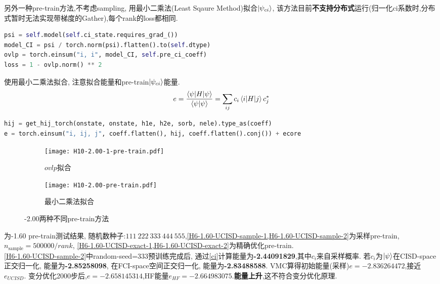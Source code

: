 另外一种pre-train方法,不考虑sampling, 用最小二乘法(Least Sqaure Method)拟合$\ket{\psi_{ci}}$,
该方法目前\textbf{不支持分布式}运行(归一化ci系数时,分布式暂时无法实现带梯度的Gather),每个rank的loss都相同.
\begin{lstlisting}[language=Python]
psi = self.model(self.ci_state.requires_grad_())
model_CI = psi / torch.norm(psi).flatten().to(self.dtype)
ovlp = torch.einsum("i, i", model_CI, self.pre_ci_coeff)
loss = 1 - ovlp.norm() ** 2
\end{lstlisting}
使用最小二乘法拟合,
注意拟合能量和pre-train$\ket{\psi_{ci}}$能量.
\begin{equation}
    e = \frac{\braket{\psi|H|\psi}}{\braket{\psi|\psi}} = \sum_{ij}c_i\braket{i|H|j}c_j^*
    \label{ci}
\end{equation}

\begin{lstlisting}[language=Python]
hij = get_hij_torch(onstate, onstate, h1e, h2e, sorb, nele).type_as(coeff)
e = torch.einsum("i, ij, j", coeff.flatten(), hij, coeff.flatten().conj()) + ecore
\end{lstlisting}

\begin{figure}[htp]
    \begin{subfigure}[b]{0.48\textwidth}
        \centering
        \texttt{[image: H10-2.00-1-pre-train.pdf]}
        \caption{$ovlp$拟合}
    \end{subfigure}
    \begin{subfigure}[b]{0.48\textwidth}
        \centering
        \texttt{[image: H10-2.00-pre-train.pdf]}
        \caption{最小二乘法拟合}
    \end{subfigure}
    \caption{-2.00两种不同pre-train方法}
\end{figure}

为-1.60 pre-train测试结果,
随机数种子:$111\ 222\ 333\ 444\ 555$,\cref{H6-1.60-UCISD-sample-1,H6-1.60-UCISD-sample-2}为采样pre-train,
$n_\mathrm{sample}=500000/rank$,
\cref{H6-1.60-UCISD-exact-1,H6-1.60-UCISD-exact-2}为精确优化pre-train.\\
\indent \cref{H6-1.60-UCISD-sample-2}中random-seed=333预训练完成后, 通过\cref{ci}计算能量为\textbf{-2.44091829},其中$c_i$来自采样概率. 
若$c_i$为$\ket{\psi}$在CISD-space正交归一化, 能量为\textbf{-2.85258098},
在FCI-space空间正交归一化, 能量为\textbf{-2.83488588}.
VMC算得初始能量(采样)$e=-2.836264472$,接近$e_{UCISD}$.
变分优化2000步后,$e=-2.658145314$,HF能量$e_{HF}=-2.664983075$.\textbf{能量上升},这不符合变分优化原理.


